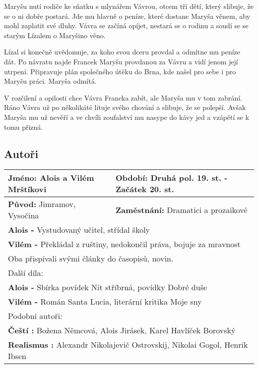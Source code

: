 Maryšu nutí rodiče ke sňatku s mlynářem Vávrou, otcem tří dětí, který slibuje, že se o ni dobře postará.
Jde mu hlavně o peníze, které dostane Maryša věnem, aby mohl zaplatit své dluhy.
Vávra se začíná opíjet, nestará se o rodinu a soudí se se starým Lízalem o Maryšino věno.

Lízal si konečně uvědomuje, za koho svou dceru provdal a odmítne mu peníze dát.
Po návratu najde Francek Maryšu provdanou za Vávru a vidí jenom její utrpení.
Připravuje plán společného útěku do Brna, kde našel pro sebe i pro Maryšu práci.
Maryša odmítá.

V rozčilení a opilosti chce Vávra Francka zabít, ale Maryša mu v tom zabrání.
Ráno Vávra už po několikáté lituje svého chování a slibuje, že se polepší.
Avšak Maryša mu už nevěří a ve chvíli zoufalství mu nasype do kávy jed a vzápětí se k tomu přizná.
\subsection*{Autoři}
\begin{tabularx}{\linewidth}{l|l}
    \textbf{Jméno:} Alois a Vilém Mrštíkovi & \textbf{Období:} Druhá pol. 19. st. - Začátek 20. st.       \\
    \hline
    \textbf{Původ:} Jimramov, Vysočina      & \textbf{Zaměstnání:} Dramatici a prozaikové                 \\
    \hline
    \multicolumn{2}{l}{\textbf{Alois -} Vystudovaný učitel, střídal školy}                                \\
    \multicolumn{2}{l}{\textbf{Vilém -} Překládal z ruštiny, nedokončil práva, bojuje za mravnost}        \\
    \multicolumn{2}{l}{Oba přispívali svými články do časopisů, novin.}                                   \\
    \hline
    \multicolumn{2}{l}{Další díla:}                                                                       \\
    \multicolumn{2}{l}{\textbf{Alois -} Sbírka povídek Nit stříbrná, povídky Dobré duše}                  \\
    \multicolumn{2}{l}{\textbf{Vilém -} Román Santa Lucia, literární kritika Moje sny}                    \\
    \hline
    \multicolumn{2}{l}{Podobní autoři:}                                                                   \\
    \multicolumn{2}{l}{\textbf{Čeští :} Božena Němcová, Alois Jirásek, Karel Havlíček Borovský}           \\
    \multicolumn{2}{l}{\textbf{Realismus :} Alexandr Nikolajevič Ostrovskij, Nikolai Gogol, Henrik Ibsen} \\
\end{tabularx}
